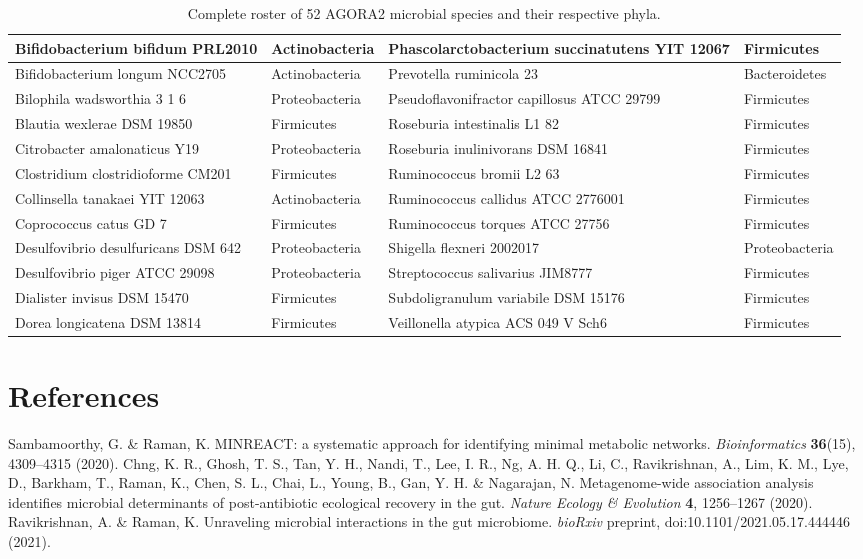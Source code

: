 \documentclass[11pt, a4paper]{article}
\begin{document}
\begin{table}[htbp]
{\begin{tabular}{|l|l|l|l|}
        Bifidobacterium bifidum PRL2010 & Actinobacteria & Phascolarctobacterium succinatutens YIT 12067 & Firmicutes \\ \hline
        Bifidobacterium longum NCC2705 & Actinobacteria & Prevotella ruminicola 23 & Bacteroidetes \\ \hline
        Bilophila wadsworthia 3 1 6 & Proteobacteria & Pseudoflavonifractor capillosus ATCC 29799 & Firmicutes \\ \hline
        Blautia wexlerae DSM 19850 & Firmicutes & Roseburia intestinalis L1 82 & Firmicutes \\ \hline
        Citrobacter amalonaticus Y19 & Proteobacteria & Roseburia inulinivorans DSM 16841 & Firmicutes \\ \hline
        Clostridium clostridioforme CM201 & Firmicutes & Ruminococcus bromii L2 63 & Firmicutes \\ \hline
        Collinsella tanakaei YIT 12063 & Actinobacteria & Ruminococcus callidus ATCC 2776001 & Firmicutes \\ \hline
        Coprococcus catus GD 7 & Firmicutes & Ruminococcus torques ATCC 27756 & Firmicutes \\ \hline
        Desulfovibrio desulfuricans DSM 642 & Proteobacteria & Shigella flexneri 2002017 & Proteobacteria \\ \hline
        Desulfovibrio piger ATCC 29098 & Proteobacteria & Streptococcus salivarius JIM8777 & Firmicutes \\ \hline
        Dialister invisus DSM 15470 & Firmicutes & Subdoligranulum variabile DSM 15176 & Firmicutes \\ \hline
        Dorea longicatena DSM 13814 & Firmicutes & Veillonella atypica ACS 049 V Sch6 & Firmicutes \\ \hline
    \end{tabular}%
    }
    \vspace{0.2cm}
    \caption{Complete roster of 52 AGORA2 microbial species and their respective phyla.}
    \label{tab:roster}
\end{table}

\section*{References}
\begin{thebibliography}{9}
     Sambamoorthy, G. \& Raman, K. MINREACT: a systematic approach for identifying minimal metabolic networks. \textit{Bioinformatics} \textbf{36}(15), 4309--4315 (2020).
     Chng, K. R., Ghosh, T. S., Tan, Y. H., Nandi, T., Lee, I. R., Ng, A. H. Q., Li, C., Ravikrishnan, A., Lim, K. M., Lye, D., Barkham, T., Raman, K., Chen, S. L., Chai, L., Young, B., Gan, Y. H. \& Nagarajan, N. Metagenome-wide association analysis identifies microbial determinants of post-antibiotic ecological recovery in the gut. \textit{Nature Ecology \& Evolution} \textbf{4}, 1256--1267 (2020).
     Ravikrishnan, A. \& Raman, K. Unraveling microbial interactions in the gut microbiome. \textit{bioRxiv} preprint, doi:10.1101/2021.05.17.444446 (2021).
\end{thebibliography}
\end{document}
